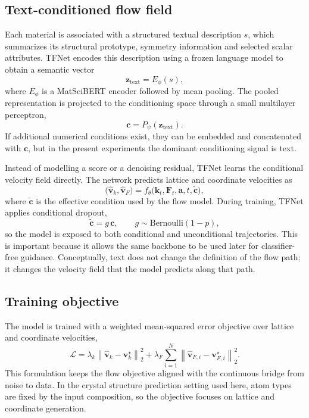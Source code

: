 \documentclass[fleqn,10pt]{wlscirep}
\begin{document}
\subsection*{Text-conditioned flow field}
Each material is associated with a structured textual description $s$, which summarizes its structural prototype, symmetry information and selected scalar attributes. TFNet encodes this description using a frozen language model to obtain a semantic vector
\begin{equation}
\mathbf{z}_{\mathrm{text}} = E_{\phi}(s),
\end{equation}
where $E_{\phi}$ is a MatSciBERT encoder followed by mean pooling. The pooled representation is projected to the conditioning space through a small multilayer perceptron,
\begin{equation}
\mathbf{c} = P_{\psi}(\mathbf{z}_{\mathrm{text}}).
\end{equation}
If additional numerical conditions exist, they can be embedded and concatenated with $\mathbf{c}$, but in the present experiments the dominant conditioning signal is text.

Instead of modelling a score or a denoising residual, TFNet learns the conditional velocity field directly. The network predicts lattice and coordinate velocities as
\begin{equation}
\big(\hat{\mathbf{v}}_{k}, \hat{\mathbf{v}}_{F}\big)
= f_{\theta}\!\big(\mathbf{k}_t, \mathbf{F}_t, \mathbf{a}, t, \tilde{\mathbf{c}}\big),
\end{equation}
where $\tilde{\mathbf{c}}$ is the effective condition used by the flow model. During training, TFNet applies conditional dropout,
\begin{equation}
\tilde{\mathbf{c}} = g\,\mathbf{c},
\qquad
g \sim \mathrm{Bernoulli}(1-p),
\end{equation}
so the model is exposed to both conditional and unconditional trajectories. This is important because it allows the same backbone to be used later for classifier-free guidance. Conceptually, text does not change the definition of the flow path; it changes the velocity field that the model predicts along that path.

\subsection*{Training objective}
The model is trained with a weighted mean-squared error objective over lattice and coordinate velocities,
\begin{equation}
\mathcal{L} = \lambda_k \left\|\hat{\mathbf{v}}_{k} - \mathbf{v}_{k}^{\star}\right\|_2^2
+ \lambda_F \sum_{i=1}^{N} \left\|\hat{\mathbf{v}}_{F,i} - \mathbf{v}_{F,i}^{\star}\right\|_2^2.
\end{equation}
This formulation keeps the flow objective aligned with the continuous bridge from noise to data. In the crystal structure prediction setting used here, atom types are fixed by the input composition, so the objective focuses on lattice and coordinate generation.
\end{document}
